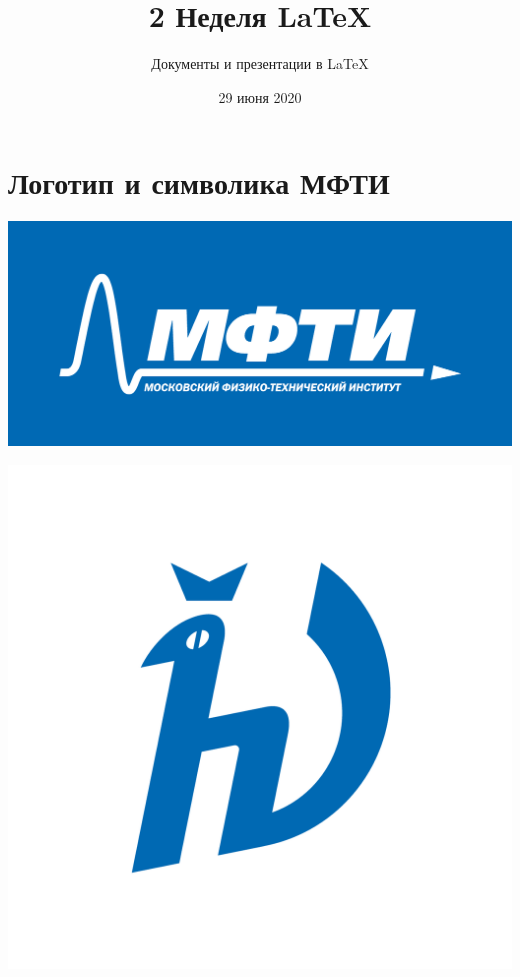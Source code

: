 \documentclass[a4paper,12pt]{article}
\author{Документы и презентации в \LaTeX}
\title{2 Неделя \LaTeX{}}
\date{29 июня 2020}
\begin{document}

\maketitle

\section{Логотип и символика МФТИ}

\includegraphics[scale=0.36]{mipt}

\includegraphics[scale=0.36]{hv.png}
\end{document}
